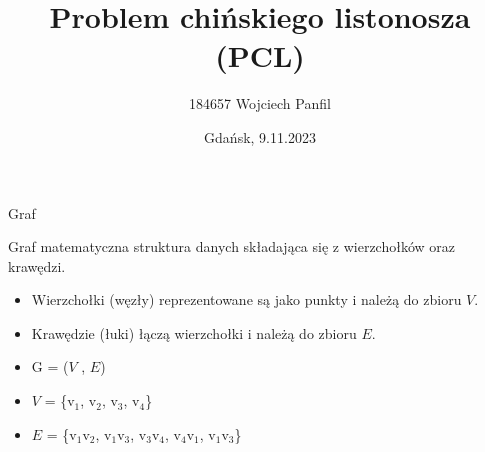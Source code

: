 \documentclass[polish,envcountsect,10pt]{beamer}
\title{Problem chińskiego listonosza (PCL)}
\author{184657 Wojciech Panfil}
\date{Gdańsk, 9.11.2023}
\begin{document}
\frame{\titlepage}

\begin{frame}{Graf}
    \begin{block}{Graf}
        matematyczna struktura danych składająca się z wierzchołków oraz krawędzi.
        \begin{itemize}
            \item Wierzchołki (węzły) reprezentowane są jako punkty i należą do zbioru $V$.
            \item Krawędzie (łuki) łączą wierzchołki i należą do zbioru $E$.
        \end{itemize}
    \end{block}
    \begin{center}
    \end{center}
    \begin{itemize}
        \item G = ($V$ , $E$)
        \item $V$ = \{v$_1$, v$_2$, v$_3$, v$_4$\}
        \item $E$ = \{v$_1$v$_2$, v$_1$v$_3$, v$_3$v$_4$, v$_4$v$_1$, v$_1$v$_3$\}
    \end{itemize}
\end{frame}
\end{document}
